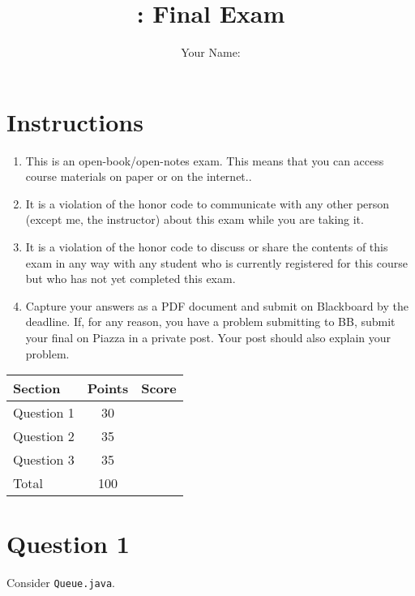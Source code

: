 \documentclass[10pt]{article}
\author{Your Name:}
\date{}
\title{\classname{}: Final Exam}
\begin{document}
\maketitle
\section*{Instructions}

\begin{enumerate}
\item This is an open-book/open-notes exam. This means that you can access course materials on paper or on the internet..

\item It is a violation of the honor code to communicate with any other person (except me, the instructor) about this exam while you are taking it.

\item It is a violation of the honor code to discuss or share the contents of this exam in any way with any student who is currently registered for this course but who has not yet completed this exam.


\item Capture your answers as a PDF document and submit on Blackboard by the deadline. If, for any reason, you have a problem submitting to BB,  submit your final on Piazza in a private post.  Your post should also explain your problem.
\end{enumerate}

\begin{center}
  \begin{tabular}{lcc}
    \toprule
    Section		&	Points	&	Score \\
    \midrule
    Question 1	&	 30	& \\
    Question 2	&	 35	& \\
    Question 3 	&	 35	& \\
    \midrule
    Total		&	100	& \\
    \bottomrule
  \end{tabular}
\end{center}

\newpage
\section{Question 1}
Consider {\tt Queue.java}.
\end{document}
